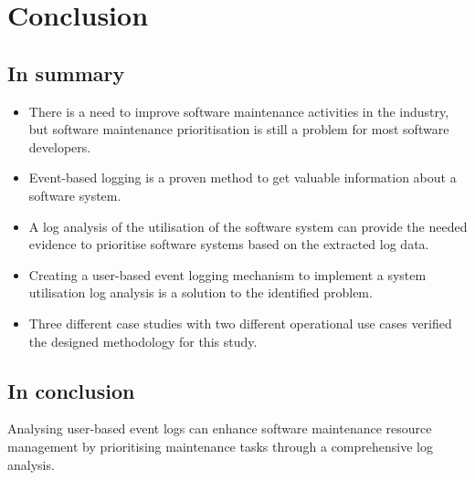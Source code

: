 \clearpage

\section{Conclusion}

\subsection{In summary}
\begin{itemize}
	\item There is a need to improve software maintenance activities in the industry, but software maintenance prioritisation is still a problem for most software developers.
	\item Event-based logging is a proven method to get valuable information about a software system.
	\item A log analysis of the utilisation of the software system can provide the needed evidence to prioritise software systems based on the extracted log data.
	\item Creating a user-based event logging mechanism to implement a system utilisation log analysis is a solution to the identified problem.
	\item Three different case studies with two different operational use cases verified the designed methodology for this study.
\end{itemize}

\subsection{In conclusion}
Analysing user-based event logs can enhance software maintenance resource management by prioritising maintenance tasks through a comprehensive log analysis.